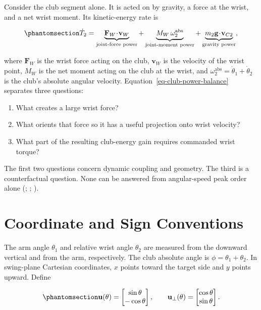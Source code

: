 \documentclass[
  letterpaper,
]{report}
\providecommand{\tightlist}{%
  \setlength{\itemsep}{0pt}\setlength{\parskip}{0pt}}
\begin{document}
Consider the club segment alone. It is acted on by gravity, a force at
the wrist, and a net wrist moment. Its kinetic-energy rate is

\begin{equation}\phantomsection\label{eq-club-power-balance}{
\dot T_2
= \underbrace{\mathbf F_W\!\cdot\!\mathbf v_W}_{\text{joint-force power}}
+ \underbrace{M_W\,\omega_2^{\mathrm{abs}}}_{\text{joint-moment power}}
+ \underbrace{m_2\mathbf g\!\cdot\!\mathbf v_{C2}}_{\text{gravity power}},
}\end{equation}

where \(\mathbf F_W\) is the wrist force acting on the club,
\(\mathbf v_W\) is the velocity of the wrist point, \(M_W\) is the net
moment acting on the club at the wrist, and
\(\omega_2^{\mathrm{abs}}=\dot\theta_1+\dot\theta_2\) is the club's
absolute angular velocity. Equation~\ref{eq-club-power-balance}
separates three questions:

\begin{enumerate}
\def\labelenumi{\arabic{enumi}.}
\tightlist
\item
  What creates a large wrist force?
\item
  What orients that force so it has a useful projection onto wrist
  velocity?
\item
  What part of the resulting club-energy gain requires commanded wrist
  torque?
\end{enumerate}

The first two questions concern dynamic coupling and geometry. The third
is a counterfactual question. None can be answered from angular-speed
peak order alone (;
;
).

\section{Coordinate and Sign
Conventions}\label{sec-interaction-conventions}

The arm angle \(\theta_1\) and relative wrist angle \(\theta_2\) are
measured from the downward vertical and from the arm, respectively. The
club absolute angle is \(\phi=\theta_1+\theta_2\). In swing-plane
Cartesian coordinates, \(x\) points toward the target side and \(y\)
points upward. Define

\begin{equation}\phantomsection\label{eq-unit-basis}{
\mathbf u(\theta)=
\begin{bmatrix}\sin\theta\\-\cos\theta\end{bmatrix},
\qquad
\mathbf u_\perp(\theta)=
\begin{bmatrix}\cos\theta\\\sin\theta\end{bmatrix}.
}\end{equation}
\end{document}
